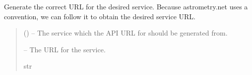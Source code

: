 \documentclass[letterpaper,11pt,english]{sphinxmanual}
\begin{document}
\begin{savenotes}
\begin{fulllineitems}
\begin{savenotes}\begin{fulllineitems}
\label{\detokenize{code/opihiexarata.astrometry.webclient:opihiexarata.astrometry.webclient.AstrometryNetWebAPIEngine.__submission_id}}
\pysigstartsignatures
{}
\pysigstopsignatures
\end{fulllineitems}\end{savenotes}


\begin{savenotes}\begin{fulllineitems}
\label{\detokenize{code/opihiexarata.astrometry.webclient:opihiexarata.astrometry.webclient.AstrometryNetWebAPIEngine._generate_service_url}}
\pysigstartsignatures
{}
\pysigstopsignatures
\sphinxAtStartPar
Generate the correct URL for the desired service. Because astrometry.net
uses a convention, we can follow it to obtain the desired service URL.
\begin{quote}\begin{description}
\sphinxAtStartPar
{} () – The service which the API URL for should be generated from.

\sphinxAtStartPar
{} – The URL for the service.

\sphinxAtStartPar
str

\end{description}\end{quote}

\end{fulllineitems}\end{savenotes}



\end{fulllineitems}
\end{savenotes}
\end{document}
